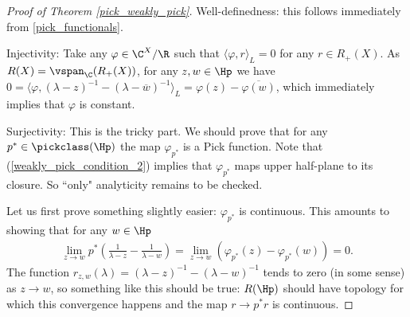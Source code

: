 \begin{proof}[Proof of Theorem \ref{pick_weakly_pick}]
	Well-definedness: this follows immediately from \ref{pick_functionals}.

	Injectivity: Take any $\varphi \in \C^{X}/\R$ such that $\langle \varphi, r \rangle_{L} = 0$ for any $r \in R_{+}(X)$. As $R(X) = \vspan_{\C}(R_{+}(X))$, for any $z, w \in \Hp$ we have $0 = \langle \varphi, (\lambda - z)^{-1} - (\lambda - \overline{w})^{-1}\rangle_{L} = \varphi(z) - \overline{\varphi(w)}$, which immediately implies that $\varphi$ is constant.

	Surjectivity: This is the tricky part. We should prove that for any $p^{*} \in \pickclass(\Hp)$ the map $\varphi_{p^{*}}$ is a Pick function. Note that (\ref{weakly_pick_condition_2}) implies that $\varphi_{p^{*}}$ maps upper half-plane to its closure. So ``only" analyticity remains to be checked.

	Let us first prove something slightly easier: $\varphi_{p^{*}}$ is continuous. This amounts to showing that for any $w \in \Hp$
	\begin{align*}
		\lim_{z \to w} p^{*}\left(\frac{1}{\lambda - z} - \frac{1}{\lambda - w} \right) = \lim_{z \to w}\left(\varphi_{p^{*}}(z) - \varphi_{p^{*}}(w)\right) = 0.
	\end{align*}
	The function $r_{z, w}(\lambda) = (\lambda - z)^{-1} - (\lambda - w)^{-1}$ tends to zero (in some sense) as $z \to w$, so something like this should be true: $R(\Hp)$ should have topology for which this convergence happens and the map $r \to p^{*} r$ is continuous.


\end{proof}
